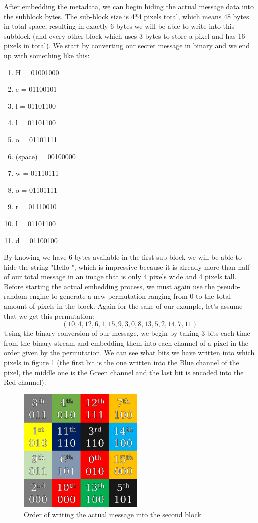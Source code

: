 \begin{multicols*}{2}
After embedding the metadata, we can begin hiding the actual message data into the subblock bytes. The sub-block size is 4*4 pixels total, which means 48 bytes in total space, resulting in exactly 6 bytes we will be able to write into this subblock (and every other block which uses 3 bytes to store a pixel and has 16 pixels in total). We start by converting our secret message in binary and we end up with something like this:
\begin{enumerate}
\item H = 01001000
\item e = 01100101
\item l = 01101100
\item l = 01101100
\item o = 01101111
\item (space) = 00100000 
\item w = 01110111 
\item o = 01101111 
\item r = 01110010 
\item l = 01101100 
\item d = 01100100
\end{enumerate}
By knowing we have 6 bytes available in the first sub-block we will be able to hide the string "Hello ", which is impressive because it is already more than half of our total message in an image that is only 4 pixels wide and 4 pixels tall. Before starting the actual embedding process, we must again use the pseudo-random engine to generate a new permutation ranging from 0 to the total amount of pixels in the block. Again for the sake of our example, let's assume that we get this permutation:
\[(10,4,12,6,1,15,9,3,0,8,13,5,2,14,7,11)\]
Using the binary conversion of our message, we begin by taking 3 bits each time from the binary stream and embedding them into each channel of a pixel in the order given by the permutation. We can see what bits we have written into which pixels in figure \ref{scramble_example_second_block} (the first bit is the one written into the Blue channel of the pixel, the middle one is the Green channel and the last bit is encoded into the Red channel).

\begin{figure}[H]
    \centering
    \includegraphics[width=6cm,keepaspectratio]{pics/bmp_scrambling/second_block_marked}
    \caption{Order of writing the actual message into the second block}
    \label{scramble_example_second_block}
\end{figure}


\end{multicols*}
